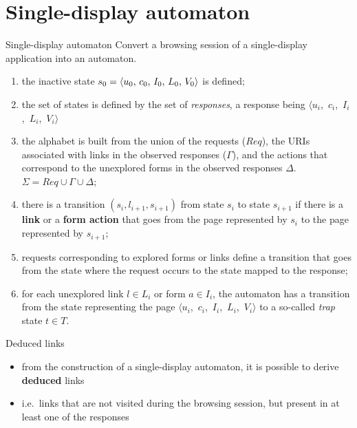 \documentclass[usenames,dvipsnames]{beamer}
\newcommand{\res}[1][]{
  \ifthenelse{\equal{#1}{}}{\mbox{$\langle u$, $c$, $I$, $L$, $V\rangle$}}
  {\mbox{$\langle u_{#1}$, $c_{#1}$, $I_{#1}$, $L_{#1}$, $V_{#1}\rangle$}}
}
\theoremstyle{definition}
\begin{document}

\section{Single-display automaton}
\begin{frame}[t,allowframebreaks]{Single-display automaton}
  Convert a browsing session of a single-display application into an automaton.

  \begin{enumerate}
    \item the inactive state $s_0 = \res[0]$ is defined;
    \item the set of states is defined by the set of \emph{responses}, a response being \res[i]
    \item the alphabet is built from the union of the requests ($Req$), the URIs associated with links in the observed responses ($\Gamma$), and the actions that correspond to the unexplored forms in the observed responses $\Delta$. $\Sigma=Req\cup\Gamma\cup\Delta$;
    \item there is a transition $(s_i,l_{i+1},s_{i+1})$ from state $s_i$ to state $s_{i+1}$ if there is a \textbf{link} or a \textbf{form action} that goes from the page represented by $s_i$ to the page represented by $s_{i+1}$;
    \item requests corresponding to explored forms or links define a transition that goes from the state where the request occurs to the state mapped to the response;
    \item for each unexplored link $l \in L_i$ or form $a \in I_i$, the automaton has a transition from the state representing the page \res[i] to a so-called \textit{trap} state $t \in T$.
  \end{enumerate}
\end{frame}

\begin{frame}{Deduced links}
  \begin{itemize}
    \item from the construction of a single-display automaton, it is possible to derive \textbf{deduced} links
    \item i.e.\ links that are not visited during the browsing session, but present in at least one of the responses
  \end{itemize}
\end{frame}
\end{document}
